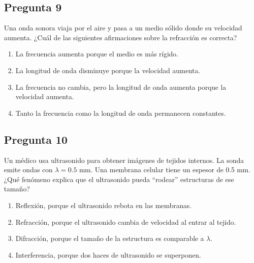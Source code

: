 \begin{preguntabox}
\section{Pregunta 9}
Una onda sonora viaja por el aire y pasa a un medio sólido donde su velocidad aumenta. ¿Cuál de las siguientes afirmaciones sobre la refracción es correcta?

\begin{enumerate}
    \item[A)] La frecuencia aumenta porque el medio es más rígido.
    \item[B)] La longitud de onda disminuye porque la velocidad aumenta.
    \item[C)] La frecuencia no cambia, pero la longitud de onda aumenta porque la velocidad aumenta.
    \item[D)] Tanto la frecuencia como la longitud de onda permanecen constantes.
\end{enumerate}
\end{preguntabox}

\begin{preguntabox}
\section{Pregunta 10}
Un médico usa ultrasonido para obtener imágenes de tejidos internos. La sonda emite ondas con $\lambda = 0.5$ mm. Una membrana celular tiene un espesor de 0.5 mm. ¿Qué fenómeno explica que el ultrasonido pueda ``rodear'' estructuras de ese tamaño?

\begin{enumerate}
    \item[A)] Reflexión, porque el ultrasonido rebota en las membranas.
    \item[B)] Refracción, porque el ultrasonido cambia de velocidad al entrar al tejido.
    \item[C)] Difracción, porque el tamaño de la estructura es comparable a $\lambda$.
    \item[D)] Interferencia, porque dos haces de ultrasonido se superponen.
\end{enumerate}
\end{preguntabox}


